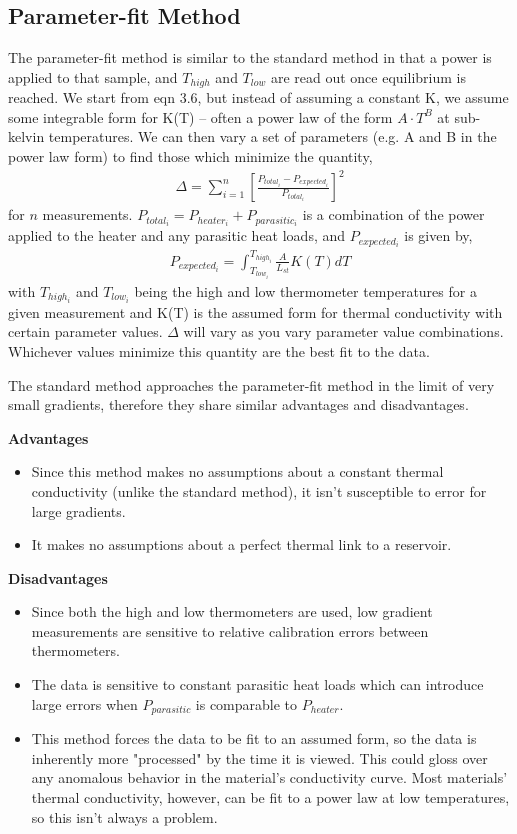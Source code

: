\documentclass{report}
\begin{document}

\subsection{Parameter-fit Method}
The parameter-fit method is similar to the standard method in that a power is applied to that sample, and $T_{high}$ and $T_{low}$ are read out once equilibrium is reached. We start
 from eqn 3.6, but instead of assuming a constant K, we assume some integrable form for K(T) -- often a power law of the form $A \cdot T^B$ at sub-kelvin temperatures. We can then vary a set of parameters (e.g. A and B in the power law form) to find those which minimize the quantity,
\begin{eqnarray}
\Delta = \sum_{i = 1}^{n} \left[\frac{P_{total_i} - P_{expected_i}}{P_{total_i}}\right]^2
\end{eqnarray}
for $n$ measurements. $P_{total_i} = P_{heater_i} + P_{parasitic_i}$ is a combination of the power applied to the heater and any parasitic heat loads, and $P_{expected_i}$ is given by,
\begin{eqnarray}
P_{expected_i} = \int_{T_{low_i}}^{T_{high_i}} \frac{A}{L_{st}}K(T)dT
\end{eqnarray}
with $T_{high_i}$ and $T_{low_i}$ being the high and low thermometer temperatures for a given measurement and K(T) is the assumed form for thermal conductivity with certain parameter values. $\Delta$ will vary as you vary parameter value combinations. Whichever values minimize this quantity are the best fit to the data.

The standard method approaches the parameter-fit method in the limit of very small gradients, therefore they share similar advantages and disadvantages.

\bigskip

\textbf{Advantages}
\begin{itemize}
\item Since this method makes no assumptions about a constant thermal conductivity (unlike the standard method), it isn't susceptible to error for large gradients.
\item It makes no assumptions about a perfect thermal link to a reservoir.
\end{itemize}

\textbf{Disadvantages}
\begin{itemize}
\item Since both the high and low thermometers are used, low gradient measurements are sensitive to relative calibration errors between thermometers.
\item The data is sensitive to constant parasitic heat loads which can introduce large errors when $P_{parasitic}$ is comparable to $P_{heater}$.
\item This method forces the data to be fit to an assumed form, so the data is inherently more "processed" by the time it is viewed. This could gloss over any anomalous behavior in the material's conductivity curve. Most materials' thermal conductivity, however, can be fit to a power law at low temperatures, so this isn't always a problem.
\end{itemize}
\end{document}
